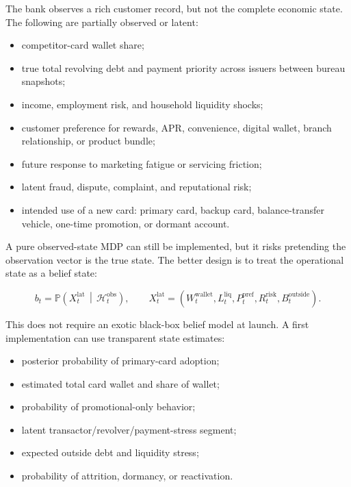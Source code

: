 \documentclass[
]{article}
\newcommand{\Prob}{\mathbb{P}}
\providecommand{\tightlist}{%
  \setlength{\itemsep}{0pt}\setlength{\parskip}{0pt}}
\begin{document}
The bank observes a rich customer record, but not the complete economic
state. The following are partially observed or latent:

\begin{itemize}
\tightlist
\item
  competitor-card wallet share;
\item
  true total revolving debt and payment priority across issuers between
  bureau snapshots;
\item
  income, employment risk, and household liquidity shocks;
\item
  customer preference for rewards, APR, convenience, digital wallet,
  branch relationship, or product bundle;
\item
  future response to marketing fatigue or servicing friction;
\item
  latent fraud, dispute, complaint, and reputational risk;
\item
  intended use of a new card: primary card, backup card,
  balance-transfer vehicle, one-time promotion, or dormant account.
\end{itemize}

A pure observed-state MDP can still be implemented, but it risks
pretending the observation vector is the true state. The better design
is to treat the operational state as a belief state:

\begin{equation}
  b_t
  =
  \Prob\!\left(
    X_t^{\mathrm{lat}}
    \,\middle|\,
    \mathcal{H}_t^{\mathrm{obs}}
  \right),
  \qquad
  X_t^{\mathrm{lat}}
  =
  (W_t^{\mathrm{wallet}},L_t^{\mathrm{liq}},P_t^{\mathrm{pref}},
    R_t^{\mathrm{risk}},B_t^{\mathrm{outside}}).
  \label{eq:belief-state}
\end{equation}

This does not require an exotic black-box belief model at launch. A
first implementation can use transparent state estimates:

\begin{itemize}
\tightlist
\item
  posterior probability of primary-card adoption;
\item
  estimated total card wallet and share of wallet;
\item
  probability of promotional-only behavior;
\item
  latent transactor/revolver/payment-stress segment;
\item
  expected outside debt and liquidity stress;
\item
  probability of attrition, dormancy, or reactivation.
\end{itemize}
\end{document}
